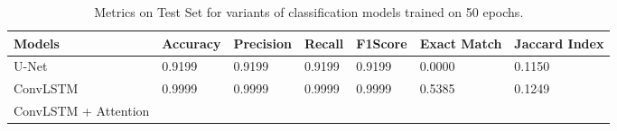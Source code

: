\begin{table*}[]
  \caption[short]{Metrics on Test Set for variants of classification models trained on 50 epochs.}
  \begin{tabular}{@{}lllllll@{}}
  \toprule
  Models               & Accuracy & Precision & Recall & F1Score & Exact Match & Jaccard Index \\ \midrule
  U-Net                & 0.9199   & 0.9199    & 0.9199 & 0.9199  & 0.0000      & 0.1150        \\
  ConvLSTM             & 0.9999   & 0.9999    & 0.9999 & 0.9999  & 0.5385      & 0.1249        \\
  ConvLSTM + Attention &          &           &        &         &             &              
  \end{tabular}
\end{table*}
